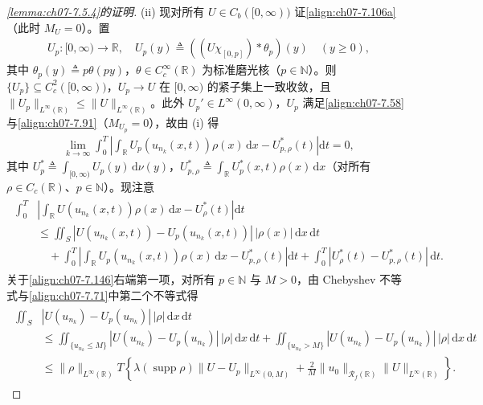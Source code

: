 \documentclass[../../main.tex]{subfiles}%
\begin{document}
\begin{proof}[\cref{lemma:ch07-7.5.4}的证明]
(ii) 现对所有 $U\in C_b([0,\infty))$ 证\eqref{align:ch07-7.106a}（此时 $M_U=0$）。置
\begin{align*}
U_p:[0,\infty)\to\mathbb{R},\quad U_p(y)\triangleq ((U\chi_{[0,p]})*\theta_p)(y)\quad(y\geqslant0),
\end{align*}
其中 $\theta_p(y)\triangleq p\theta(py)$，$\theta\in C^\infty_c(\mathbb{R})$ 为标准磨光核（$p\in\mathbb{N}$）。则 $\{U_p\}\subseteq C^2_c([0,\infty))$，$U_p\to U$ 在 $[0,\infty)$ 的紧子集上一致收敛，且 $\|U_p\|_{L^\infty(\mathbb{R})}\leqslant\|U\|_{L^\infty(\mathbb{R})}$。此外 $U_p'\in L^\infty(0,\infty)$，$U_p$ 满足\eqref{align:ch07-7.58}与\eqref{align:ch07-7.91}（$M_{U_p}=0$），故由 (i) 得
\begin{align}
\lim_{k\to\infty}\int_0^T\left|\int_{\mathbb{R}}U_p(u_{n_k}(x,t))\rho(x)\,\mathrm{d}x-U_{p,\rho}^*(t)\right|\mathrm{d}t=0, \label{align:ch07-7.145}
\end{align}
其中 $U_p^*\triangleq \int_{[0,\infty)}U_p(y)\,\mathrm{d}\nu(y)$，$U_{p,\rho}^*\triangleq \int_{\mathbb{R}}U_p^*(x,t)\rho(x)\,\mathrm{d}x$（对所有 $\rho\in C_c(\mathbb{R})$、$p\in\mathbb{N}$）。现注意
\begin{align}
\begin{aligned}
\int_0^T&\left|\int_{\mathbb{R}}U(u_{n_k}(x,t))\rho(x)\,\mathrm{d}x-U_\rho^*(t)\right|\mathrm{d}t\\
&\leqslant\iint_S|U(u_{n_k}(x,t))-U_p(u_{n_k}(x,t))|\,|\rho(x)|\,\mathrm{d}x\,\mathrm{d}t\\
&\quad+\int_0^T\left|\int_{\mathbb{R}}U_p(u_{n_k}(x,t))\rho(x)\,\mathrm{d}x-U_{p,\rho}^*(t)\right|\mathrm{d}t
+\int_0^T|U_\rho^*(t)-U_{p,\rho}^*(t)|\,\mathrm{d}t.
\end{aligned} 
\label{align:ch07-7.146}
\end{align}
关于\eqref{align:ch07-7.146}右端第一项，对所有 $p\in\mathbb{N}$ 与 $M>0$，由 Chebyshev 不等式与\eqref{align:ch07-7.71}中第二个不等式得
\begin{align}
\begin{aligned}
\iint_S&|U(u_{n_k})-U_p(u_{n_k})|\,|\rho|\,\mathrm{d}x\,\mathrm{d}t\\
&\leqslant\iint_{\{u_{n_k}\leqslant M\}}|U(u_{n_k})-U_p(u_{n_k})|\,|\rho|\,\mathrm{d}x\,\mathrm{d}t
+\iint_{\{u_{n_k}>M\}}|U(u_{n_k})-U_p(u_{n_k})|\,|\rho|\,\mathrm{d}x\,\mathrm{d}t\\
&\leqslant\|\rho\|_{L^\infty(\mathbb{R})}T\left\{\lambda(\operatorname{supp}\rho)\|U-U_p\|_{L^\infty(0,M)}+\frac{2}{M}\|u_0\|_{\mathscr{R}_f(\mathbb{R})}\|U\|_{L^\infty(\mathbb{R})}\right\}.
\end{aligned} 

\end{align}
\end{proof}
\end{document}

